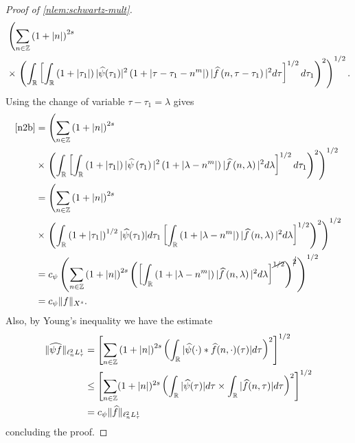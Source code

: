 \begin{proof}[Proof of \cref{nlem:schwartz-mult}]
\begin{equation}
\begin{split}
		& \left( \sum_{n \in \mathbb{Z}} \left (1 + |n| \right )^{2s}  \right.
		\\
		& \times \left. \left( \int_{\mathbb{R}} \left[ \int_{\mathbb{R}}
		\left( 1 + | \tau_{1} | \right) | \widehat{\psi}(\tau_1) |^2 \left( 1 + |
		\tau - \tau_1 - n^{m} |
		\right) | \widehat{f}\left( n, \tau - \tau_1 \right) |^2 d \tau 
    \right]^{1/2} d \tau_{1} \right)^2 \right)^{1/2}.
	\end{split}
\end{equation}
%
%
Using the change of variable $\tau - \tau_1 = \lambda$ gives
%
%
\begin{equation*}
	\begin{split}
		\eqref{n2b}
		& = \left( \sum_{n \in \mathbb{Z}} \left (1 + |n| \right )^{2s}\right.
		\\
		& \times \left.  \left( \int_{\mathbb{R}} \left[
		\int_{\mathbb{R}} \left( 1 + | \tau_1 | \right) | \widehat{\psi}\left( \tau_1
		\right) |^2 \left( 1 + | \lambda - n^{m} | \right) | \widehat{f} \left( n,
		\lambda
    \right)|^2 d \lambda \right]^{1/2} d \tau_{1} \right)^2 \right)^{1/2}
		\\
		& =  \left( \sum_{n \in \mathbb{Z}} \left (1 + |n| \right )^{2s} \right.
		\\
		& \times \left. \left( \int_{\mathbb{R}} \left( 1 + |
		\tau_1 |
		\right)^{1/2} | \widehat{\psi}(\tau_1) | d \tau_1 \left[ \int_{\mathbb{R}} \left( 1 + |
		\lambda - n^{m} |
		\right) | \widehat{f}\left( n, \lambda \right) |^2 d \lambda \right]^{1/2}
		\right)^2 \right)^{1/2}
		\\
		& = c_{\psi} \left( \sum_{n \in \mathbb{Z}} \left (1 + |n| \right )^{2s} \left( \left[ \int_{\mathbb{R}}
		\left( 1 + | \lambda - n^{m} | \right) | \widehat{f}\left( n, \lambda
		\right) |^2 d \lambda
		\right]^{\cancel{1/2}} \right)^{\cancel{2}} \right)^{1/2}
		\\
		& = c_{\psi} \|f\|_{X^s}.
	\end{split}
\end{equation*}
%
Also, by Young's inequality we have the estimate 
%
%
\begin{equation*}
\begin{split}
  \|\widehat{\psi f}\|_{\ell^{2}_{n} L^{1}_{\tau}} 
  & = \left[ \sum_{n \in \mathbb{Z}} \left (1 + |n| \right )^{2s} \left (
  \int_{\mathbb{R}} | \widehat{\psi}(\cdot) * \widehat{f}(n, \cdot)(\tau) | d \tau  \right ) ^2 \right]^{1/2}
  \\
  & \le  \left[ \sum_{n \in \mathbb{Z}} (1 + | n |)^{2s} \left( \int_{\mathbb{R}} |
    \widehat{\psi}(\tau) | d \tau  \times \int_{\mathbb{R}} | \widehat{f}(n, \tau) | d \tau
    \right)^{2}\right]^{1/2}
  \\
  & = c_{\psi} \| \widehat{f} \|_{\ell^{2}_{n} L^{1}_{\tau}}
\end{split}
\end{equation*}
%
%
%
concluding the proof. 
\end{proof}
